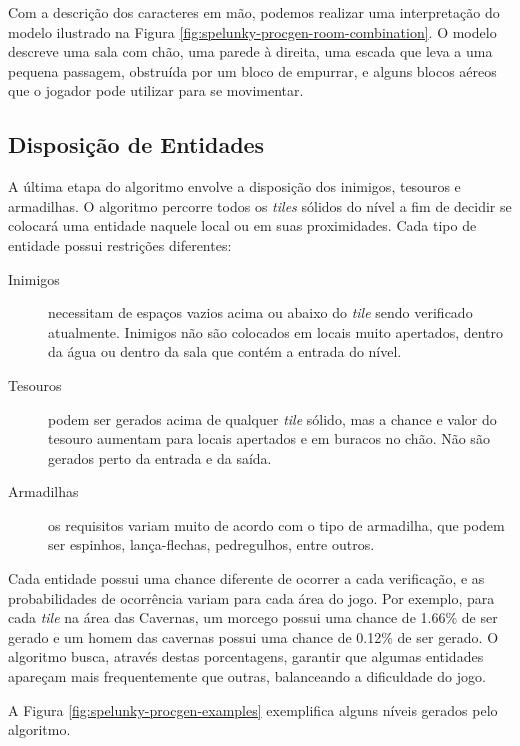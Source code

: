 Com a descrição dos caracteres em mão, podemos realizar uma interpretação do
modelo ilustrado na Figura \ref{fig:spelunky-procgen-room-combination}. O modelo
descreve uma sala com chão, uma parede à direita, uma escada que leva a uma
pequena passagem, obstruída por um bloco de empurrar, e alguns blocos aéreos que
o jogador pode utilizar para se movimentar.

\subsection{\label{section:spelunky-procgen-entities}Disposição de Entidades}
A última etapa do algoritmo envolve a disposição dos inimigos, tesouros e
armadilhas. O algoritmo percorre todos os \textit{tiles} sólidos do nível a fim
de decidir se colocará uma entidade naquele local ou em suas proximidades.  Cada
tipo de entidade possui restrições diferentes:

\begin{description}
	\item[Inimigos]
	necessitam de espaços vazios acima ou abaixo do \textit{tile} sendo
	verificado atualmente. Inimigos não são colocados em locais muito apertados,
	dentro da água ou dentro da sala que contém a entrada do nível.

	\item[Tesouros]
	podem ser gerados acima de qualquer \textit{tile} sólido, mas a chance e
	valor do tesouro aumentam para locais apertados e em buracos no chão. Não
	são gerados perto da entrada e da saída.

	\item[Armadilhas]
	os requisitos variam muito de acordo com o tipo de armadilha, que podem ser
	espinhos, lança-flechas, pedregulhos, entre outros.
\end{description}

Cada entidade possui uma chance diferente de ocorrer a cada verificação, e as
probabilidades de ocorrência variam para cada área do jogo. Por exemplo, para
cada \textit{tile} na área das Cavernas, um morcego possui uma chance de 1.66\%
de ser gerado e um homem das cavernas possui uma chance de 0.12\% de ser gerado.
O algoritmo busca, através destas porcentagens, garantir que algumas entidades
apareçam mais frequentemente que outras, balanceando a dificuldade do jogo.

A Figura \ref{fig:spelunky-procgen-examples} exemplifica alguns níveis gerados
pelo algoritmo.


